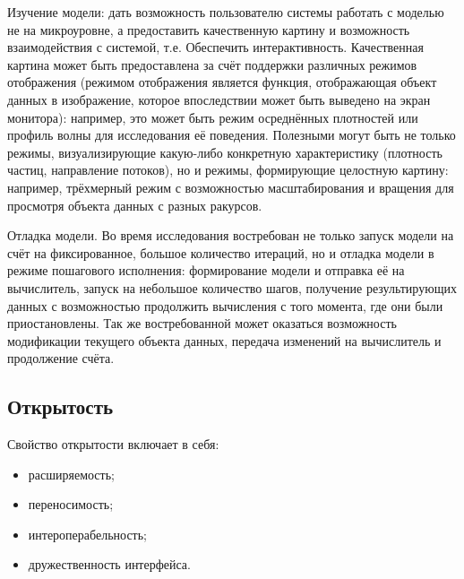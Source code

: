 \documentclass[a4paper,12pt]{extarticle}
\begin{document}
\begin{subsubsection}{Изучение модели}: 
    дать возможность пользователю системы работать с моделью не на микроуровне, а предоставить качественную картину и возможность взаимодействия с системой, т.е. Обеспечить интерактивность. Качественная картина может быть предоставлена за счёт поддержки различных режимов отображения (режимом отображения является функция, отображающая объект данных в изображение, которое впоследствии может быть выведено на экран монитора): например, это может быть режим осреднённых плотностей или профиль волны для исследования её поведения. Полезными могут быть не только режимы, визуализирующие какую-либо конкретную характеристику (плотность частиц, направление потоков), но и режимы, формирующие целостную картину: например, трёхмерный режим с возможностью масштабирования и вращения для просмотря объекта данных с разных ракурсов.
\end{subsubsection}
    
\begin{subsubsection}{Отладка модели}. 
    Во время исследования востребован не только запуск модели на счёт на фиксированное, большое количество итераций, но и отладка модели в режиме пошагового исполнения: формирование модели и отправка её на вычислитель, запуск на небольшое количество шагов, получение результирующих данных с возможностью продолжить вычисления с того момента, где они были приостановлены. Так же востребованной может оказаться возможность модификации текущего объекта данных, передача изменений на вычислитель и продолжение счёта.
\end{subsubsection}

\subsection{Открытость}
\label{sec:requirements-open}

Свойство открытости включает в себя:
\begin{itemize}
    \item расширяемость;
    \item переносимость;
    \item интероперабельность;
    \item дружественность интерфейса.
\end{itemize}
\end{document}
